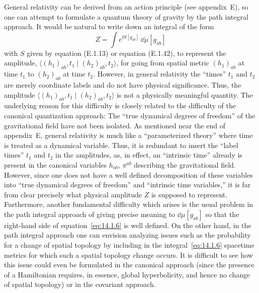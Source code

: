 General relativity can be derived from an action principle (see appendix~E), so one
can attempt to formulate a quantum theory of gravity by the path integral approach.
It would be natural to write down an integral of the form
\begin{equation}
  Z=\int e^{\ii S[g_{ab}]}\,\dd\mu[g_{ab}]
  \tag{14.1.6}\label{eq:14.1.6}
\end{equation}
with \(S\) given by equation (E.1.13) or equation (E.1.42), to represent the amplitude,
\(\langle(h_1)_{ab},t_1\mid(h_2)_{ab},t_2\rangle\), for going from spatial metric
\((h_1)_{ab}\) at time \(t_1\) to \((h_2)_{ab}\) at time \(t_2\). However, in general
relativity the ``times'' \(t_1\) and \(t_2\) are merely coordinate labels and do not have
physical significance. Thus, the amplitude
\(\langle(h_1)_{ab},t_1\mid(h_2)_{ab},t_2\rangle\) is not a physically meaningful
quantity. The underlying reason for this difficulty is closely related to the difficulty
of the canonical quantization approach: The ``true dynamical degrees of freedom'' of
the gravitational field have not been isolated. As mentioned near the end of appendix~E,
general relativity is much like a ``parameterized theory'' where time is treated as a
dynamical variable. Thus, it is redundant to insert the ``label times'' \(t_1\) and \(t_2\)
in the amplitudes, as, in effect, an ``intrinsic time'' already is present in the canonical
variables \(h_{ab}\), \(\pi^{ab}\) describing the gravitational field. However, since one
does not have a well defined decomposition of these variables into ``true dynamical
degrees of freedom'' and ``intrinsic time variables,'' it is far from clear precisely what
physical amplitude \(Z\) is supposed to represent. Furthermore, another fundamental
difficulty which arises is the usual problem in the path integral approach of giving
precise meaning to \(\dd\mu[g_{ab}]\) so that the right-hand side of
equation~\eqref{eq:14.1.6} is well defined. On the other hand, in the path integral
approach one can envision analyzing issues such as the probability for a change of
spatial topology by including in the integral~\eqref{eq:14.1.6} spacetime metrics for
which such a spatial topology change occurs. It is difficult to see how this issue could
even be formulated in the canonical approach (since the presence of a Hamiltonian
requires, in essence, global hyperbolicity, and hence no change of spatial topology) or
in the covariant approach.

